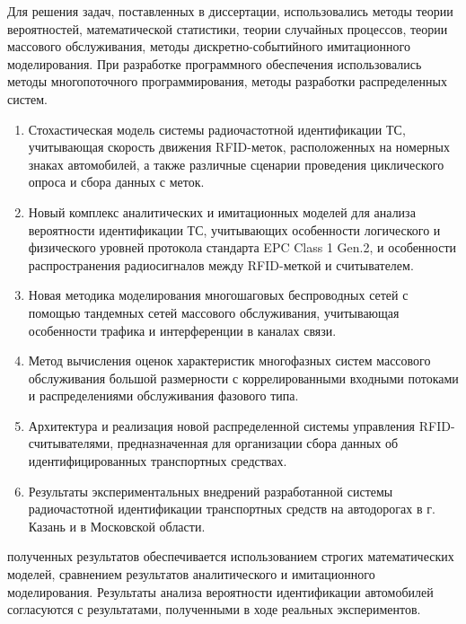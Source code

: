 {\methods} Для решения задач, поставленных в диссертации, использовались методы теории вероятностей, математической статистики, теории случайных процессов, теории массового обслуживания, методы дискретно-событийного имитационного моделирования. При разработке программного обеспечения использовались методы многопоточного программирования, методы разработки распределенных систем.

{}
\begin{enumerate}[beginpenalty=10000] %
    \item Стохастическая модель системы радиочастотной идентификации ТС, учитывающая скорость движения RFID-меток, расположенных на номерных знаках автомобилей, а также различные сценарии проведения циклического опроса и сбора данных с меток.
    \item Новый комплекс аналитических и имитационных моделей для анализа вероятности идентификации ТС, учитывающих особенности логического и физического уровней протокола стандарта EPC Class 1 Gen.2, и особенности распространения радиосигналов между RFID-меткой и считывателем.
    \item Новая методика моделирования многошаговых беспроводных сетей с помощью тандемных сетей массового обслуживания, учитывающая особенности трафика и интерференции в каналах связи.
    \item Метод вычисления оценок характеристик многофазных систем массового обслуживания большой размерности с коррелированными входными потоками и распределениями обслуживания фазового типа.
    \item Архитектура и реализация новой распределенной системы управления RFID-считывателями, предназначенная для организации сбора данных об идентифицированных транспортных средствах.
    \item Результаты экспериментальных внедрений разработанной системы радиочастотной идентификации транспортных средств на автодорогах в г. Казань и в Московской области.
\end{enumerate}

{\reliability} полученных результатов обеспечивается использованием строгих математических моделей, сравнением результатов аналитического и имитационного моделирования. Результаты анализа вероятности идентификации автомобилей согласуются с результатами, полученными в ходе реальных экспериментов.


